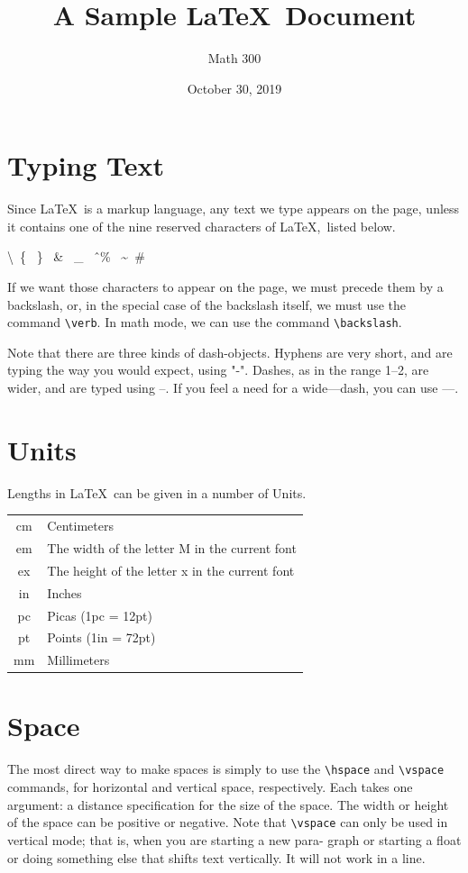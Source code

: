 \documentclass[12pt]{article}
\title{A Sample \LaTeX \ Document}
\author{Math 300}
\date{October 30, 2019}
\begin{document}
\maketitle

\section{Typing Text}
Since \LaTeX\ is a markup language, any text we type appears on the page, unless it contains one of the nine reserved characters of \LaTeX,\ listed below.

\textbackslash \ \{ \ \} \ \& \ \_ \ \^ \  \% \ \textasciitilde \ \#

If we want those characters to appear on the page, we must precede them by a backslash, or, in the special case of the backslash itself, we must use the command \verb|\verb|. In math mode, we can use the command \verb|\backslash|.

\indent Note that there are three kinds of dash-objects. Hyphens are very short, and are typing the way you would expect, using "-". Dashes, as in the range 1–2, are wider, and are typed using --. If you feel a need for a wide—dash,
you can use ---.

\section{Units}
Lengths in \LaTeX\ can be given in a number of Units.\\
\begin{tabular}{@{\hspace{3pt}}cl}
	cm & Centimeters\\
	em & The width of the letter M in the current font\\
	ex & The height of the letter x in the current font\\
	in & Inches\\
	pc & Picas (1pc = 12pt)\\
	pt & Points (1in = 72pt)\\
	mm & Millimeters\\
\end{tabular}

\section{Space}
The most direct way to make spaces is simply to use the \verb|\hspace| and \verb|\vspace| commands, for horizontal and vertical space, respectively. Each takes one argument: a distance specification for the size of the space. The width or height of the space can be positive or negative. Note that \verb|\vspace| can only be used in vertical mode; that is, when you are starting a new para- graph or starting a float or doing something else that shifts text vertically. It will not work in a line.
\end{document}
